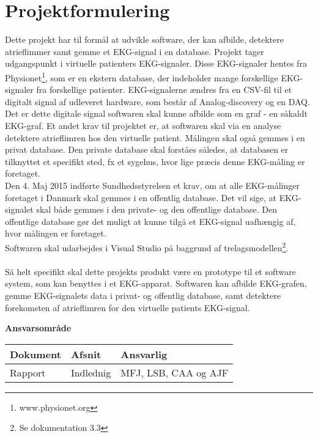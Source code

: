 \chapter{Projektformulering}

Dette projekt har til formål at udvikle software, der kan afbilde, detektere atrieflimmer samt gemme et EKG-signal i en database. Projekt tager udgangspunkt i virtuelle patienters EKG-signaler. Disse EKG-signaler hentes fra Physionet\footnote{www.physionet.org}, som er en ekstern database, der indeholder mange forskellige EKG-signaler fra forskellige patienter. EKG-signalerne  ændres fra en CSV-fil til et digitalt signal af udleveret hardware, som består af Analog-discovery og en DAQ. \\
Det er dette digitale signal softwaren skal kunne afbilde som en graf - en såkaldt EKG-graf. Et andet krav til projektet er, at softwaren skal via en analyse detektere atrieflimren hos den virtuelle patient. Målingen skal også gemmes i en privat database. Den private database skal forståes således, at databasen er tilknyttet et specifikt sted, fx et sygehus, hvor lige præcis denne EKG-måling er foretaget. \\
Den 4. Maj 2015 indførte Sundhedsstyrelsen et krav, om at alle EKG-målinger foretaget i Danmark skal gemmes i en offentlig database. Det vil sige, at EKG-signalet skal både gemmes i den private- og den offentlige database. Den offentlige database gør det muligt at kunne tilgå et EKG-signal uafhængig af, hvor målingen er foretaget.\\
Softwaren skal udarbejdes i Visual Studio på baggrund af trelagsmodellen\footnote{Se dokumentation 3.3}.\\ \\
Så helt specifikt skal dette projekts produkt være en prototype til et software system, som kan benyttes i et EKG-apparat. Softwaren kan afbilde EKG-grafen, gemme EKG-signalets data i privat- og offentlig database, samt detektere forekomsten af atrieflimren for den virtuelle patients EKG-signal.  


\textbf{Ansvarsområde}
\begin{longtabu} to 
    Dokument &    Afsnit &    Ansvarlig\\[-1ex]
    \midrule
    Rapport &   Indlednig	&    MFJ, LSB, CAA og AJF\\

\end{longtabu}